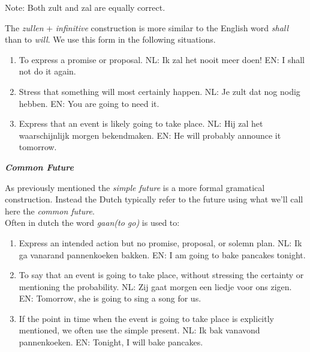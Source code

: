 \documentclass[letterpaper,11pt]{article}
\begin{document}
Note: Both zult and zal are equally correct.
\par{The \textit{zullen} + \textit{infinitive} construction is more similar to the English word \textit{shall} than to
\textit{will}. We use this form in the following situations.}
\begin{enumerate}[topsep=0pt, parsep=0pt, partopsep=0pt, itemsep=0pt]
    \item To express a promise or proposal.
        \subitem \small{NL: Ik zal het nooit meer doen!} 
        \subitem \small{EN: I shall not do it again.} 
    \item Stress that something will most certainly happen.
        \subitem \small{NL: Je zult dat nog nodig hebben.} 
        \subitem \small{EN: You are going to need it.} 
    \item Express that an event is likely going to take place.
        \subitem \small{NL: Hij zal het waarschijnlijk morgen bekendmaken.} 
        \subitem \small{EN: He will probably announce it tomorrow.} 
\end{enumerate}
\textit{\textbf{\small{Common Future}}}
\par{As previously mentioned the \textit{simple future} is a more formal
    gramatical construction. Instead the Dutch typically refer to the future using
what we'll call here the \textit{common future}.}
\\
Often in dutch the word \textit{gaan(to go)} is used to:
\begin{enumerate}[topsep=0pt, parsep=0pt, partopsep=0pt, itemsep=0pt]
    \item Express an intended action but no promise, proposal, or solemn plan.
        \subitem \small{NL: Ik ga vanarand pannenkoeken bakken.} 
        \subitem \small{EN: I am going to bake pancakes tonight.} 
    \item To say that an event is going to take place, without stressing the
        certainty or mentioning the probability.
        \subitem \small{NL: Zij gaat morgen een liedje voor ons zigen.} 
        \subitem \small{EN: Tomorrow, she is going to sing a song for us.} 
    \item If the point in time when the event is going to take place is explicitly
        mentioned, we often use the simple present.
        \subitem \small{NL: Ik bak vanavond pannenkoeken.} 
        \subitem \small{EN: Tonight, I will bake pancakes.} 
\end{enumerate}
\end{document}
